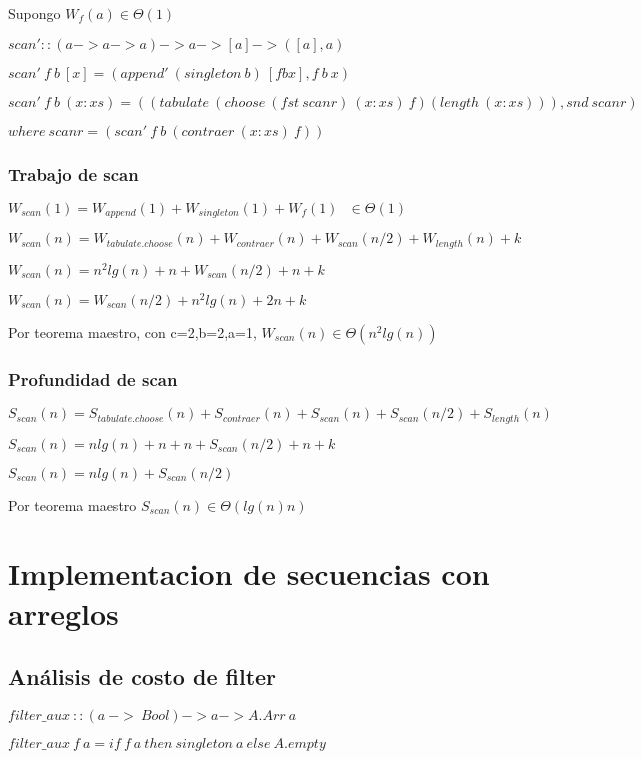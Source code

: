 \documentclass[a4paper,12pt]{article}
\begin{document}
Supongo $W_{f}(a) \in \Theta(1)$

$scan' ::  (a -> a -> a) -> a -> [a] -> ([a], a)$

$scan' \:f \:b \:[x] = (append'\: (singleton \:b)\: [f b x], f\: b\: x) $

$scan' \:f\: b\: (x:xs) = ((tabulate\: (choose\: (fst\: scanr) \:(x:xs) \:f) (length\: (x:xs))), snd \:scanr) $

$where\: scanr = (scan' \:f\: b\: (contraer\: (x:xs)\: f))$

\subsubsection{Trabajo de scan}

$W_{scan}(1) = W_{append}(1) + W_{singleton}(1) + W_{f}(1) \:\:\: \in \Theta(1)$

$W_{scan}(n) = W_{tabulate.choose}(n) + W_{contraer}(n) + W_{scan}(n/2) + W_{length}(n) + k$

$W_{scan}(n) = n^2 lg(n) + n + W_{scan}(n/2) + n + k$

$W_{scan}(n) = W_{scan}(n/2) + n^2 lg(n) + 2n + k$

Por teorema maestro, con c=2,b=2,a=1, $W_{scan}(n) \in \Theta(n^2 lg(n))$

\subsubsection{Profundidad de scan}

$S_{scan}(n) = S_{tabulate.choose} (n) + S_{contraer}(n) + S_{scan} (n) + S_{scan}(n/2) + S_{length}(n)$

$S_{scan}(n) = nlg(n) + n + n + S_{scan}(n/2) + n + k$

$S_{scan}(n) = nlg(n) + S_{scan}(n/2)$

Por teorema maestro $S_{scan}(n) \in \Theta(lg(n)n)$

\section{Implementacion de secuencias con arreglos}

\subsection{Análisis de costo de filter}


$filter\_aux\: :: (a\: -> \:Bool) -> a -> A.Arr\: a$


$filter\_aux\: f\: a = if\: f \:a \:then\: singleton\: a\: else \:A.empty$
\end{document}
